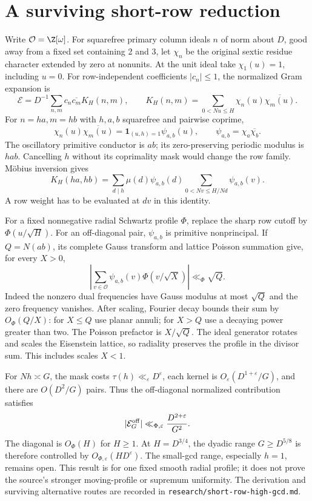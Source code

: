 \documentclass[11pt,oneside,openany]{book}
\theoremstyle{definition}\newtheorem{definition}[theorem]{Definition}
\theoremstyle{remark}\newtheorem{remark}[theorem]{Remark}
\begin{document}
\section{A surviving short-row reduction}
Write $\mathcal O=\Z[\omega]$. For squarefree primary column ideals $n$ of norm about $D$, good away from a fixed set containing 2 and 3, let $\chi_n$ be the original sextic residue character extended by zero at nonunits. At the unit ideal take $\chi_1(u)=1$, including $u=0$. For row-independent coefficients $|c_n|\le1$, the normalized Gram expansion is
\[
 \mathcal E=D^{-1}\sum_{n,m}c_n\overline{c_m}K_H(n,m),\qquad
 K_H(n,m)=\sum_{0<Nu\le H}\chi_n(u)\overline{\chi_m(u)}.
\]
For $n=ha,m=hb$ with $h,a,b$ squarefree and pairwise coprime,
\[
 \chi_n(u)\overline{\chi_m(u)}
 =\mathbf1_{(u,h)=1}\psi_{a,b}(u),\qquad \psi_{a,b}=\chi_a\overline{\chi_b}.
\]
The oscillatory primitive conductor is $ab$; its zero-preserving periodic modulus is $hab$. Cancelling $h$ without its coprimality mask would change the row family. M\"obius inversion gives
\[
 K_H(ha,hb)=\sum_{d\mid h}\mu(d)\psi_{a,b}(d)
  \sum_{0<Nv\le H/Nd}\psi_{a,b}(v).
\]
A row weight has to be evaluated at $dv$ in this identity.

For a fixed nonnegative radial Schwartz profile $\Phi$, replace the sharp row cutoff by $\Phi(u/\sqrt H)$. For an off-diagonal pair, $\psi_{a,b}$ is primitive nonprincipal. If $Q=N(ab)$, its complete Gauss transform and lattice Poisson summation give, for every $X>0$,
\[
 \left|\sum_{v\in\mathcal O}\psi_{a,b}(v)\Phi(v/\sqrt X)\right|\ll_\Phi\sqrt Q.
\]
Indeed the nonzero dual frequencies have Gauss modulus at most $\sqrt Q$ and the zero frequency vanishes. After scaling, Fourier decay bounds their sum by $O_\Phi(Q/X)$: for $X\le Q$ use planar annuli; for $X>Q$ use a decaying power greater than two. The Poisson prefactor is $X/\sqrt Q$. The ideal generator rotates and scales the Eisenstein lattice, so radiality preserves the profile in the divisor sum. This includes scales $X<1$.

For $Nh\asymp G$, the mask costs $\tau(h)\ll_\varepsilon D^\varepsilon$, each kernel is $O_\varepsilon(D^{1+\varepsilon}/G)$, and there are $O(D^2/G)$ pairs. Thus the off-diagonal normalized contribution satisfies
\[
 |\mathcal E_G^{\rm off}|\ll_{\Phi,\varepsilon}\frac{D^{2+\varepsilon}}{G^2}.
\]
The diagonal is $O_\Phi(H)$ for $H\ge1$. At $H=D^{3/4}$, the dyadic range $G\ge D^{5/8}$ is therefore controlled by $O_{\Phi,\varepsilon}(HD^\varepsilon)$. The small-gcd range, especially $h=1$, remains open. This result is for one fixed smooth radial profile; it does not prove the source's stronger moving-profile or supremum uniformity. The derivation and surviving alternative routes are recorded in \texttt{research/short-row-high-gcd.md}.
\end{document}
